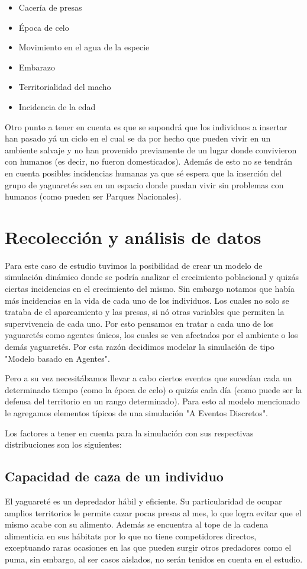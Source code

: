     \begin{itemize}
        \item Cacería de presas
        \item Época de celo
        \item Movimiento en el agua de la especie
        \item Embarazo
        \item Territorialidad del macho
        \item Incidencia de la edad
    \end{itemize}

    Otro punto a tener en cuenta es que se supondrá que los individuos a insertar han pasado yá un ciclo en el cual se da por hecho que pueden vivir en un ambiente salvaje y no han provenido previamente de un lugar donde convivieron con humanos (es decir, no fueron domesticados).
    Además de esto no se tendrán en cuenta posibles incidencias humanas ya que sé espera que la inserción del grupo de yaguaretés sea en un espacio donde puedan vivir sin problemas con humanos (como pueden ser Parques Nacionales).

\section{Recolección y análisis de datos}
    Para este caso de estudio tuvimos la posibilidad de crear un modelo de simulación dinámico donde se podría analizar
    el crecimiento poblacional y quizás ciertas incidencias en el crecimiento del mismo. Sin embargo notamos que había
    más incidencias en la vida de cada uno de los individuos. Los cuales no solo se trataba de el apareamiento y las
    presas, si nó otras variables que permiten la supervivencia de cada uno. Por esto pensamos en tratar a cada uno de
    los yaguaretés como agentes únicos, los cuales se ven afectados por el ambiente o los demás yaguaretés. Por esta
    razón decidimos modelar la simulación de tipo "Modelo basado en Agentes".

    Pero a su vez necesitábamos llevar a cabo ciertos eventos que sucedían cada un determinado tiempo (como la época de
celo) o quizás cada día (como puede ser la defensa del territorio en un rango determinado). Para esto al modelo
mencionado le agregamos elementos típicos de una simulación "A Eventos Discretos".

    Los factores a tener en cuenta para la simulación con sus respectivas distribuciones son los siguientes:
    
   \subsection{Capacidad de caza de un individuo}
    El yaguareté es un depredador hábil y eficiente. Su particularidad de ocupar amplios territorios le permite cazar pocas presas al mes, lo que logra evitar que el mismo acabe con su alimento. Además se encuentra al tope de la cadena alimenticia en sus hábitats por lo que no tiene competidores directos, exceptuando raras ocasiones en las que pueden surgir otros predadores como el puma, sin embargo, al ser casos aislados, no serán tenidos en cuenta en el estudio.
    
